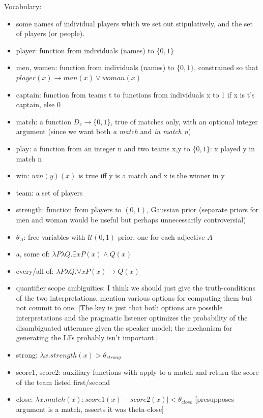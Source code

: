 \documentclass[12pt]{article}
\begin{document}
\noindent Vocabulary:
\begin{itemize}
\item some names of individual players which we set out stipulatively, and the set of players (or people).
\item player: function from individuals (names) to $\{0,1\}$
\item men, women: function from individuals (names) to $\{0,1\}$, constrained so that $\mathit{player}(x) \rightarrow \mathit{man}(x) \vee \mathit{woman}(x)$
\item captain: function from teams t to functions from individuals x to 1 if x is t's captain, else 0
\item match: a function $D_e \rightarrow \{0,1\}$, true of matches only, with an optional integer argument (since we want both \emph{a match} and \emph{in match n}) 
\item play: a function from an integer n and two teams x,y to $\{0,1\}$: x played y in match n
\item win: $\mathit{win}(y)(x)$ is true iff y is a match and x is the winner in y
\item team: a set of players
\item strength: function from players to $(0,1)$, Gaussian prior (separate priors for men and woman would be useful but perhaps unnecessarily controversial)
\item $\theta_A$: free variables with $\mathcal{U}(0,1)$ prior, one for each adjective $A$
\item a, some of: $\lambda P \lambda Q . \exists x P(x) \wedge Q(x)$
\item every/all of: $\lambda P \lambda Q . \forall x P(x) \rightarrow Q(x)$
\item quantifier scope ambiguities: I think we should just give the truth-conditions of the two interpretations, mention various options for computing them but not commit to one. [The key is just that both options are possible interpretations and the pragmatic listener optimizes the probability of the disambiguated utterance given the speaker model; the mechanism for generating the LFs probably isn't important.]
\item strong: $\lambda x . \mathit{strength}(x) > \theta_{\mathit{strong}}$
\item score1, score2: auxiliary functions with apply to a match and return the score of the team listed first/second 
\item close: $\lambda x . \mathit{match}(x): \mathit{score1}(x) - \mathit{score2}(x)| < \theta_{\mathit{close}}$ [presupposes argument is a match, asserts it was theta-close]

\end{itemize}
\end{document}
